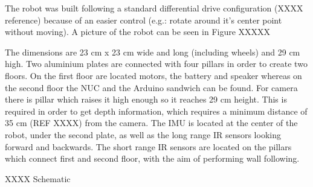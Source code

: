 The robot was built following a standard differential drive configuration (XXXX reference) because of an easier control (e.g.: rotate around it's center point without moving). A picture of the robot can be seen in Figure XXXXX

The dimensions are 23 cm x 23 cm wide and long (including wheels) and 29 cm high. Two aluminium plates are connected with four pillars in order to create two floors. On the first floor are located motors, the battery and speaker whereas on the second floor the NUC and the Arduino sandwich can be found. For camera there is pillar which raises it high enough so it reaches 29 cm height. This is required in order to get depth information, which requires a minimum distance of 35 cm (REF XXXX) from the camera. The IMU is located at the center of the robot, under the second plate, as well as the long range IR sensors looking forward and backwards. The short range IR sensors are located on the pillars which connect first and second floor, with the aim of performing wall following.

XXXX Schematic